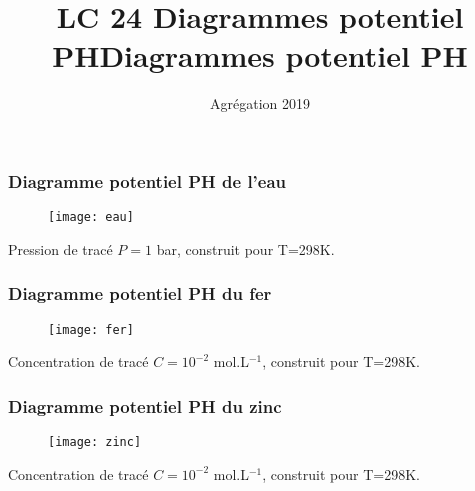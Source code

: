\documentclass{beamer}
\title{LC 24 Diagrammes potentiel PH}
\institute{Université Paul sabatier}
\date{Agrégation 2019}
\begin{document}
	
\begin{frame}
	\titlepage
\end{frame}

\addtocounter{framenumber}{-1}
\title{Diagrammes potentiel PH}

\begin{frame}
\frametitle{Diagramme potentiel PH de l'eau}
\begin{figure}[H]
	\centering
		\texttt{[image: eau]}
\end{figure}
Pression de tracé $P=1$ bar, construit pour T=298K.
\end{frame}

\begin{frame}
\frametitle{Diagramme potentiel PH du fer}
\begin{figure}
	\centering \texttt{[image: fer]}
\end{figure}
Concentration de tracé $C=10^{-2}$ mol.L$^{-1}$, construit pour T=298K.
\end{frame}

\begin{frame}
\frametitle{Diagramme potentiel PH du zinc}
\begin{figure}[H]
	\centering
	\texttt{[image: zinc]}
\end{figure}
Concentration de tracé $C=10^{-2}$ mol.L$^{-1}$, construit pour T=298K.
\end{frame}
\end{document}
